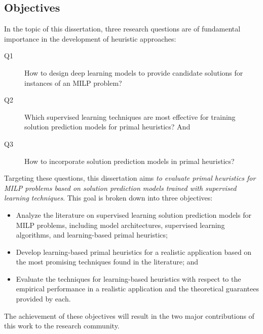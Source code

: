 \subsection*{Objectives}\label{chap:objectives}

In the topic of this dissertation, three research questions are of fundamental importance in the development of heuristic approaches:
\begin{description}
    \item[Q1] How to design deep learning models to provide candidate solutions for instances of an MILP problem?
    \item[Q2] Which supervised learning techniques are most effective for training solution prediction models for primal heuristics? And
    \item[Q3] How to incorporate solution prediction models in primal heuristics?
\end{description}
Targeting these questions, this dissertation aims \emph{to evaluate primal heuristics for MILP problems based on solution prediction models trained with supervised learning techniques}.
This goal is broken down into three objectives:
\begin{itemize}
    \item Analyze the literature on supervised learning solution prediction models for MILP problems, including model architectures, supervised learning algorithms, and learning-based primal heuristics;
    \item Develop learning-based primal heuristics for a realistic application based on the most promising techniques found in the literature; and
    \item Evaluate the techniques for learning-based heuristics with respect to the empirical performance in a realistic application and the theoretical guarantees provided by each.
\end{itemize}
The achievement of these objectives will result in the two major contributions of this work to the research community.

